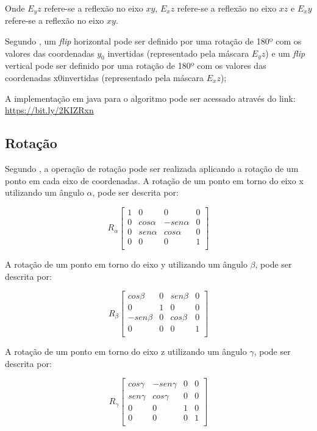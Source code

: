\documentclass[
	12pt,				%
	oneside,			%
	a4paper,			%
	english,			%
	french,				%
	spanish,			%
	brazil,				%
	]{abntex2}
\begin{document}
Onde \(E_yz\) refere-se a reflexão no eixo \(xy\), \(E_xz\) refere-se a reflexão no eixo \(xz\) e \(E_xy\) refere-se a reflexão no eixo \(xy\).

Segundo \citet{conciAzevedoLeta:2008}, um \textit{flip} horizontal pode ser definido por uma rotação de 180º com os valores das coordenadas \(y_0\) invertidas (representado pela máscara \(E_yz\)) e um \textit{flip} vertical pode ser definido por uma rotação de 180º com os valores das coordenadas x0invertidas (representado pela máscara \(E_xz\));

A implementação em java para o algoritmo pode ser acessado através do link: \url{https://bit.ly/2KIZRxn}

\subsection{Rotação}

Segundo \citet{pedriniSchwartz:2008}, a operação de rotação pode ser realizada aplicando a rotação de um ponto em cada eixo de coordenadas. A rotação de um ponto em torno do eixo x utilizando um ângulo \(\alpha\), pode ser descrita por:

\[
R_\alpha
\begin{bmatrix}
    1 &         0 &          0 & 0   \\ 
	0 & cos\alpha & -sen\alpha & 0   \\ 
	0 & sen\alpha &  cos\alpha & 0   \\ 
	0 &         0 &          0 & 1   \\ 
\end{bmatrix} 
\]

A rotação de um ponto em torno do eixo y utilizando um ângulo \(\beta\), pode ser descrita por:

\[
R_\beta
\begin{bmatrix}
     cos\beta & 0 & sen\beta & 0   \\ 
	        0 & 1 & 0        & 0   \\ 
	-sen\beta & 0 & cos\beta & 0   \\ 
            0 & 0 &        0 & 1   \\ 
\end{bmatrix} 
\]

A rotação de um ponto em torno do eixo z utilizando um ângulo \(\gamma\), pode ser descrita por:

\[
R_\gamma
\begin{bmatrix}
    cos\gamma & -sen\gamma & 0 & 0   \\ 
	sen\gamma &  cos\gamma & 0 & 0   \\ 
	        0 &          0 & 1 & 0   \\ 
            0 &          0 & 0 & 1   \\ 
\end{bmatrix} 
\]
\end{document}
